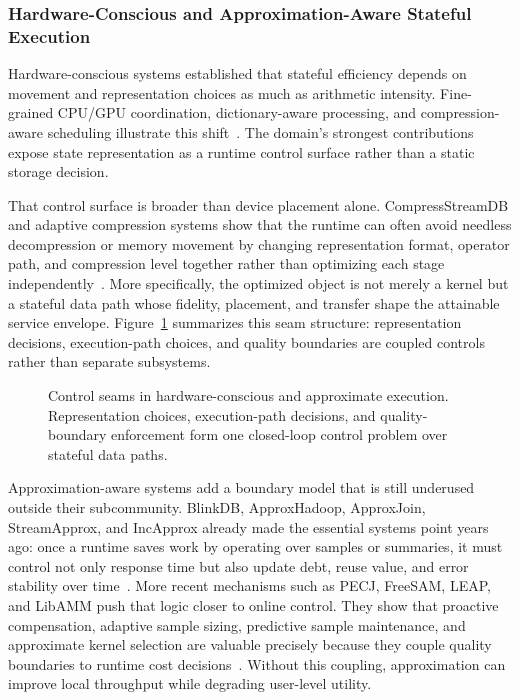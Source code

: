 \documentclass[acmsmall,screen,review]{acmart}
\begin{document}
\subsubsection{Hardware-Conscious and Approximation-Aware Stateful Execution}

Hardware-conscious systems established that stateful efficiency depends on movement and representation choices as much as arithmetic intensity. Fine-grained CPU/GPU coordination, dictionary-aware processing, and compression-aware scheduling illustrate this shift~\cite{zhang2020finestream,zeng2024cstream}. The domain's strongest contributions expose state representation as a runtime control surface rather than a static storage decision.

That control surface is broader than device placement alone. CompressStreamDB and adaptive compression systems show that the runtime can often avoid needless decompression or memory movement by changing representation format, operator path, and compression level together rather than optimizing each stage independently~\cite{zhang2023compressstreamdb,yu2025adaptivecompression}. More specifically, the optimized object is not merely a kernel but a stateful data path whose fidelity, placement, and transfer shape the attainable service envelope. Figure~\ref{fig:execution-seams} summarizes this seam structure: representation decisions, execution-path choices, and quality boundaries are coupled controls rather than separate subsystems.

\begin{figure}[t]
\centering
\resizebox{0.94\textwidth}{!}{}
\caption{Control seams in hardware-conscious and approximate execution. Representation choices, execution-path decisions, and quality-boundary enforcement form one closed-loop control problem over stateful data paths.}
\label{fig:execution-seams}
\end{figure}

Approximation-aware systems add a boundary model that is still underused outside their subcommunity. BlinkDB, ApproxHadoop, ApproxJoin, StreamApprox, and IncApprox already made the essential systems point years ago: once a runtime saves work by operating over samples or summaries, it must control not only response time but also update debt, reuse value, and error stability over time~\cite{agarwal2013blinkdb,goiri2015approxhadoop,wang2018approxjoin,hu2018streamapprox,chen2018incapprox}. More recent mechanisms such as PECJ, FreeSAM, LEAP, and LibAMM push that logic closer to online control. They show that proactive compensation, adaptive sample sizing, predictive sample maintenance, and approximate kernel selection are valuable precisely because they couple quality boundaries to runtime cost decisions~\cite{zeng2024pecj,tang2025freesam,xu2024leap,zeng2024libamm}. Without this coupling, approximation can improve local throughput while degrading user-level utility.
\end{document}
